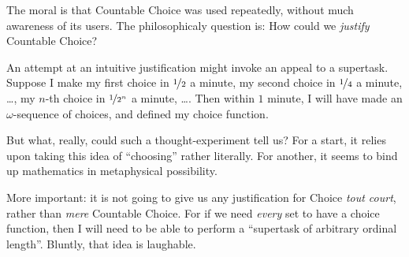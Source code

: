 \documentclass[../../../include/open-logic-section]{subfiles}
\begin{document}
The moral is that Countable Choice was used repeatedly, without much awareness of its users. The philosophicaly question is: How could we \emph{justify} Countable Choice? 

An attempt at an intuitive justification might invoke an appeal to a supertask. Suppose I make my first choice in $\nicefrac{1}{2}$ a minute, my second choice in $\nicefrac{1}{4}$ a minute, \ldots, my $n$-th choice in $\nicefrac{1}{2^n}$ a minute, \ldots. Then within $1$ minute, I will have made an $\omega$-sequence of choices, and defined my choice function. 

But what, really, could such a thought-experiment tell us? For a start, it relies upon taking this idea of ``choosing'' rather literally. For another, it seems to bind up mathematics in metaphysical possibility. 

More important: it is not going to give us any justification for Choice \emph{tout court}, rather than \emph{mere} Countable Choice. For if we need \emph{every} set to have a choice function, then I will need to be able to perform a ``supertask of arbitrary ordinal length''. Bluntly, that idea is laughable.
\end{document}
